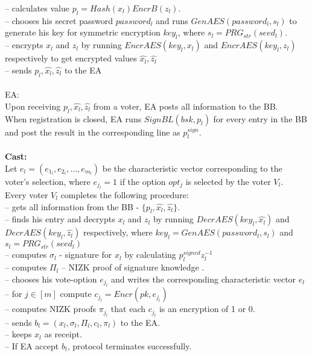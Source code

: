 \documentclass[12pt]{article}
\begin{document}
-- calculates value $p_l = Hash(x_l)EncrB(z_l)$.\\
--  chooses his secret password $password_l$ and runs  $ GenAES(password_l, s_l)$ to generate his key for symmetric encryption $key_l$, where $s_l = PRG_{str}(seed_l)$.\\
--  encrypts $x_l$ and $z_l$ by running  $EncrAES(key_l,x_l)$ and $EncrAES(key_l,z_l)$ respectively to get encrypted values $\hat{x_l},\hat{z_l}$\\
-- sends $p_l,\hat{x_l},\hat{z_l}$ to the EA\\\\
 EA:\\
Upon receiving $p_l,\hat{x_l},\hat{z_l}$ from a voter, EA posts all information to the BB.\\
When registration is closed, EA runs  $SignBL(bsk, p_l)$ for every entry in the BB and post the result in the corresponding line as $p^{sign}_l$.\\\\
\textbf{Cast:}\\
Let $e_l = (e_{1_l},e_{2_l},\dots,e_{m_l})$ be the characteristic vector corresponding to the voter's selection, where $e_{j_l}=1$ if the option $opt_j$ is selected by the voter $V_l$.\\ 
Every voter $V_l$ completes the following procedure:\\
-- gets all information from the BB - $\{p_l,\hat{x_l},\hat{z_l}\}$.\\
-- finds his entry and decrypts $x_l$ and $z_l$ by running $DecrAES(key_l,\hat{x_l})$ and $DecrAES(key_l,\hat{z_l})$ respectively, where $key_l =  GenAES(password_l, s_l)$ and  $s_l = PRG_{str}(seed_l)$\\
-- computes  $\sigma_l$ - signature for $x_l$  by calculating  $p^{signed}_lz_l^{-1}$\\
-- computes $\Pi_l$ -- NIZK proof of signature knowledge .\\
-- chooses his vote-option $e_{j_l}$ and writes the corresponding characteristic vector $e_l$\\
-- for $j \in [m]$ compute $c_{j_l} =  Encr(pk,e_{j_l})$\\
-- computes NIZK proofs $\pi_{j_l}$ that each $c_{j_l}$ is an encryption of 1 or 0.\\
-- sends $b_l = (x_l, \sigma_l, \Pi_l, c_l, \pi_l)$ to the EA.\\
-- keeps $x_l$ as receipt.\\
-- If EA accept $b_l$, protocol terminates successfully.\\ 
\end{document}
